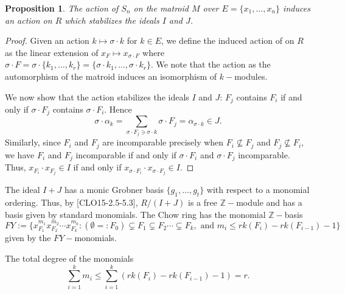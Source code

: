 \documentclass[12pt]{article}
\newtheorem{proposition}{Proposition}[section]
\begin{document}
\begin{proposition}
    The action of $S_n$ on the matroid $M$ over $E=\{x_1,\ldots,x_n\}$ induces an action on $R$ which stabilizes the ideals $I$ and $J$.
\end{proposition}
\begin{proof}
    Given an action $k \mapsto \sigma\cdot k$ for $k\in E$, we define the induced action of on $R$ as the linear extension of
    $x_F \mapsto x_{\sigma\cdot F}$ where $\sigma\cdot F = \sigma\cdot\{k_1,\ldots, k_r\}=\{\sigma\cdot k_1,\ldots,\sigma\cdot k_r\}$.
    We note that the action as the automorphism of the matroid induces an isomorphism of $k-$modules.

    \vspace*{3mm}
    We now show that the action stabilizes the ideals $I$ and $J$:
    $F_j$ contains $F_i$ if and only if $\sigma\cdot F_j$ contains $\sigma \cdot F_i$. Hence
    $$\sigma\cdot \alpha_k=\sum_{\sigma\cdot F_j \ni \sigma\cdot k}{\sigma\cdot F_j} =\alpha_{\sigma\cdot k}\in J.$$
    Similarly, since $F_i$ and $F_j$ are incomparable precisely when $F_i\nsubseteq F_j$ and $F_j\nsubseteq F_i$,
    we have $F_i$ and $F_j$ incomparable if and only if $\sigma\cdot F_i$ and $\sigma\cdot F_j$ incomparable.
    Thus, $x_{F_i}\cdot x_{F_j}\in I$ if and only if $x_{\sigma\cdot F_i}\cdot x_{\sigma\cdot F_j}\in I$.
\end{proof}

The ideal $I+J$ has a monic Grobner basis $\{g_1,\ldots,g_t\}$ with respect to a monomial ordering. Thus, by [CLO15-2.5-5.3],
$R/(I+J)$ is a free $\mathbb{Z}-$module and has a basis given by standard monomials.
The Chow ring has the monomial $\mathbb{Z}-$basis
$$FY:=\{x_{F_1}^{m_1}x_{F_2}^{m_2}\cdots x_{F_k}^{m_k}: (\emptyset=:F_0)\subsetneq F_1\subsetneq F_2\cdots\subsetneq F_k, \text{ and }
    m_i\leq rk(F_i)-rk(F_{i-1})-1\}$$
given by the $FY-$monomials.

\vspace*{3mm}
The total degree of the monomials
$$\sum_{i=1}^{k}{m_i}\leq\sum_{i=1}^{k}{(rk(F_i)-rk(F_{i-1})-1)}=r.$$
\end{document}
